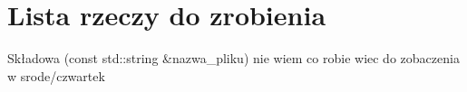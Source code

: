 \chapter{Lista rzeczy do zrobienia}
\hypertarget{todo}{}\label{todo}

\begin{DoxyRefList}
\item[Składowa \doxylink{funkcje_8h_a6ec432145e723804f4e2036fe6867d44}{czytaj\+\_\+pary} (const std\+::string \&nazwa\+\_\+pliku)]\label{todo__todo000001}%
%
nie wiem co robie wiec do zobaczenia w srode/czwartek 
\end{DoxyRefList}